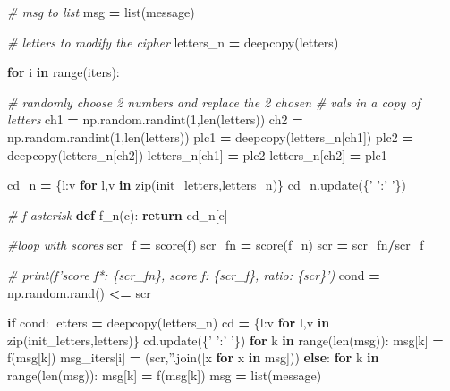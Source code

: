 \documentclass[]{article}
\newenvironment{Shaded}{\begin{snugshade}}{\end{snugshade}}
\newcommand{\BuiltInTok}[1]{#1}
\newcommand{\CommentTok}[1]{\textcolor[rgb]{0.56,0.35,0.01}{\textit{#1}}}
\newcommand{\ControlFlowTok}[1]{\textcolor[rgb]{0.13,0.29,0.53}{\textbf{#1}}}
\newcommand{\DecValTok}[1]{\textcolor[rgb]{0.00,0.00,0.81}{#1}}
\newcommand{\KeywordTok}[1]{\textcolor[rgb]{0.13,0.29,0.53}{\textbf{#1}}}
\newcommand{\NormalTok}[1]{#1}
\newcommand{\OperatorTok}[1]{\textcolor[rgb]{0.81,0.36,0.00}{\textbf{#1}}}
\newcommand{\StringTok}[1]{\textcolor[rgb]{0.31,0.60,0.02}{#1}}
\begin{document}
\begin{Shaded}
\begin{Highlighting}[]
    \CommentTok{# msg to list}
\NormalTok{    msg }\OperatorTok{=} \BuiltInTok{list}\NormalTok{(message)}

    \CommentTok{# letters to modify the cipher}
\NormalTok{    letters_n }\OperatorTok{=}\NormalTok{ deepcopy(letters)}

    \ControlFlowTok{for}\NormalTok{ i }\KeywordTok{in} \BuiltInTok{range}\NormalTok{(iters):}

        \CommentTok{# randomly choose 2 numbers and replace the 2 chosen }
        \CommentTok{# vals in a copy of letters}
\NormalTok{        ch1 }\OperatorTok{=}\NormalTok{ np.random.randint(}\DecValTok{1}\NormalTok{,}\BuiltInTok{len}\NormalTok{(letters))}
\NormalTok{        ch2 }\OperatorTok{=}\NormalTok{ np.random.randint(}\DecValTok{1}\NormalTok{,}\BuiltInTok{len}\NormalTok{(letters))}
\NormalTok{        plc1 }\OperatorTok{=}\NormalTok{ deepcopy(letters_n[ch1])}
\NormalTok{        plc2 }\OperatorTok{=}\NormalTok{ deepcopy(letters_n[ch2])}
\NormalTok{        letters_n[ch1] }\OperatorTok{=}\NormalTok{ plc2}
\NormalTok{        letters_n[ch2] }\OperatorTok{=}\NormalTok{ plc1}

\NormalTok{        cd_n }\OperatorTok{=}\NormalTok{ \{l:v }\ControlFlowTok{for}\NormalTok{ l,v }\KeywordTok{in} \BuiltInTok{zip}\NormalTok{(init_letters,letters_n)\}}
\NormalTok{        cd_n.update(\{}\StringTok{' '}\NormalTok{:}\StringTok{' '}\NormalTok{\})}

        \CommentTok{# f asterisk}
        \KeywordTok{def}\NormalTok{ f_n(c):}
            \ControlFlowTok{return}\NormalTok{ cd_n[c]}

        \CommentTok{#loop with scores}
\NormalTok{        scr_f }\OperatorTok{=}\NormalTok{ score(f)}
\NormalTok{        scr_fn }\OperatorTok{=}\NormalTok{ score(f_n)}
\NormalTok{        scr }\OperatorTok{=}\NormalTok{ scr_fn}\OperatorTok{/}\NormalTok{scr_f}

        \CommentTok{# print(f'score f*: \{scr_fn\}, score f: \{scr_f\}, ratio: \{scr\}')}
\NormalTok{        cond }\OperatorTok{=}\NormalTok{ np.random.rand() }\OperatorTok{<=}\NormalTok{ scr}

        \ControlFlowTok{if}\NormalTok{ cond:}
\NormalTok{            letters }\OperatorTok{=}\NormalTok{ deepcopy(letters_n)}
\NormalTok{            cd }\OperatorTok{=}\NormalTok{ \{l:v }\ControlFlowTok{for}\NormalTok{ l,v }\KeywordTok{in} \BuiltInTok{zip}\NormalTok{(init_letters,letters)\}}
\NormalTok{            cd.update(\{}\StringTok{' '}\NormalTok{:}\StringTok{' '}\NormalTok{\})}
            \ControlFlowTok{for}\NormalTok{ k }\KeywordTok{in} \BuiltInTok{range}\NormalTok{(}\BuiltInTok{len}\NormalTok{(msg)):}
\NormalTok{                msg[k] }\OperatorTok{=}\NormalTok{ f(msg[k])}
\NormalTok{            msg_iters[i] }\OperatorTok{=}\NormalTok{ (scr,}\StringTok{''}\NormalTok{.join([x }\ControlFlowTok{for}\NormalTok{ x }\KeywordTok{in}\NormalTok{ msg]))}
        \ControlFlowTok{else}\NormalTok{:}
            \ControlFlowTok{for}\NormalTok{ k }\KeywordTok{in} \BuiltInTok{range}\NormalTok{(}\BuiltInTok{len}\NormalTok{(msg)):}
\NormalTok{                msg[k] }\OperatorTok{=}\NormalTok{ f(msg[k])}
\NormalTok{        msg }\OperatorTok{=} \BuiltInTok{list}\NormalTok{(message)}
    

\end{Highlighting}
\end{Shaded}
\end{document}
